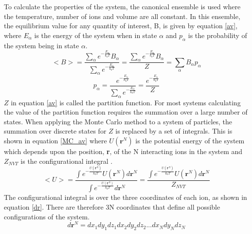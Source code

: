 \documentclass[11pt, twoside]{report}
\begin{document}
To calculate the properties of the system, the canonical ensemble is used where the temperature, number of ions and volume are all constant. In this ensemble, the equilibrium value for any quantity of interest, B, is given by equation \ref{av}, where $E_\alpha$ is the energy of the system when in state $\alpha$ and $p_\alpha$ is the probability of the system being in state $\alpha$.
\begin{equation}\label{av}
<B> = \frac{ \sum_\alpha e^{-\frac{E_\alpha}{k_bT}} B_\alpha}{ \sum_\alpha e^{-\frac{E_\alpha}{k_bT}}} = \frac{ \sum_\alpha e^{-\frac{E_\alpha}{k_bT}} B_\alpha}{Z} = \sum_\alpha B_\alpha p_\alpha
\end{equation}
\begin{equation}\label{prob}
p_\alpha = \frac{  e^{-\frac{E_\alpha}{k_bT}} }{ \sum_{\alpha} e^{-\frac{E_\alpha}{k_bT}}} =\frac{  e^{-\frac{E_\alpha}{k_bT}} }{Z}
\end{equation}
$Z$ in equation \ref{av} is called the partition function. For most systems calculating the value of the partition function requires the summation over a large number of states. When applying the Monte Carlo method to a system of particles, the summation over discrete states for $Z$ is replaced by a set of integrals. This is shown in equation \ref{MC_av} where $U(\mathbf{r}^N)$ is the potential energy of the system which depends upon the position, \textbf{r}, of the N interacting ions in the system and $Z_{NVT}$ is the configurational integral \cite{Lesar3}.
\begin{equation}\label{MC_av}
<U> = \frac{ \int e^{-\frac{U(\mathbf{r}^N)}{k_bT}} U(\mathbf{r}^N) d\mathbf{r}^N}{\int e^{-\frac{U(\mathbf{r}^N)}{k_bT}} d\mathbf{r}^N}  = \frac{  \int e^{-\frac{U(\mathbf{r}^N)}{k_bT}} U(\mathbf{r}^N) d\mathbf{r}^N}{Z_{NVT}} 
\end{equation}
The configurational integral is over the three coordinates of each ion, as shown in equation \ref{dr}. There are therefore 3N coordinates that define all possible configurations of the system.
\begin{equation}d \mathbf{r}^N = dx_1 dy_1 dz_1 dx_2 dy_2 dz_2... dx_N dy_N dz_N\end{equation}\label{dr}
\end{document}

